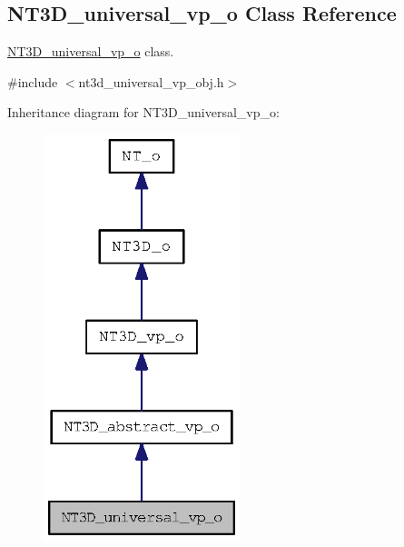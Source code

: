 \subsection{NT3D\_\-universal\_\-vp\_\-o Class Reference}
\label{class_n_t3_d__universal__vp__o}


\hyperlink{class_n_t3_d__universal__vp__o}{NT3D\_\-universal\_\-vp\_\-o} class.  




{\ttfamily \#include $<$nt3d\_\-universal\_\-vp\_\-obj.h$>$}



Inheritance diagram for NT3D\_\-universal\_\-vp\_\-o:
\nopagebreak
\begin{figure}[H]
\begin{center}
\leavevmode
\includegraphics[width=162pt]{class_n_t3_d__universal__vp__o__inherit__graph}
\end{center}
\end{figure}


